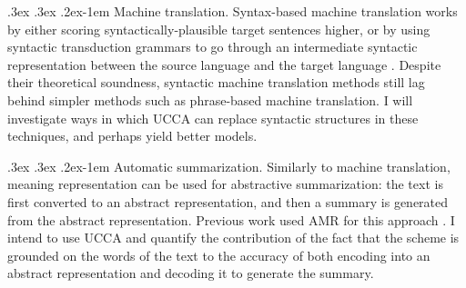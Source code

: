 \documentclass[11pt]{article}
\makeatletter
\renewcommand{\paragraph}{
  \@startsection{paragraph}{4}
  {\z@}{.3ex \@plus .3ex \@minus .2ex}{-1em}
  {\normalfont\normalsize\bfseries}
}
\makeatother
\begin{document}
\paragraph{Machine translation.}
Syntax-based machine translation works by either scoring syntactically-plausible target sentences higher,
or by using syntactic transduction grammars to go through an intermediate syntactic representation between
the source language and the target language \cite{nadejde2013edinburgh}.
Despite their theoretical soundness, syntactic machine translation methods still lag behind simpler methods
such as phrase-based machine translation.
I will investigate ways in which UCCA can replace syntactic structures in these techniques, and perhaps
yield better models.

\paragraph{Automatic summarization.}
Similarly to machine translation, meaning representation can be used for abstractive summarization:
the text is first converted to an abstract representation, and then a summary is generated from the abstract
representation. Previous work used AMR \cite{banarescu2013abstract} for this approach \cite{liu2015toward}.
I intend to use UCCA and quantify the contribution of the fact that the scheme is grounded on the words of the
text to the accuracy of both encoding into an abstract representation and decoding it to generate the summary.




\end{document}
